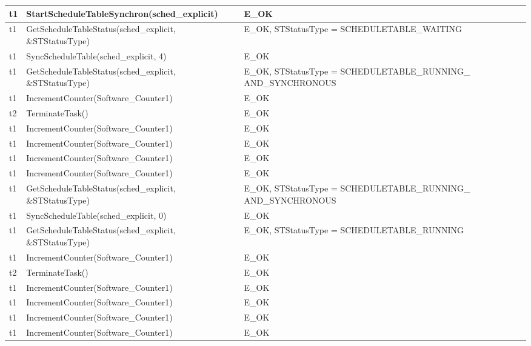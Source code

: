 \documentclass[10pt]{article}
\newlength{\Li}\settowidth{\Li}{Running}
\newlength{\Lii}\setlength{\Lii}{7cm}
\newlength{\Liiii}\setlength{\Liiii}{0.9cm}
\newlength{\Liii}\setlength{\Liii}{\textwidth} \addtolength{\Liii}{-\Li} \addtolength{\Liii}{-\Lii} \addtolength{\Liii}{-\Liiii}
\begin{document}
	\begin{supertabular}{|p{\Li}|p{\Lii}|p{\Liii}|p{\Liiii}|} \hline 
	t1		& StartScheduleTableSynchron(sched\_explicit)					& E\_OK																	& \\ \hline
	t1		& GetScheduleTableStatus(sched\_explicit, \&STStatusType)			& E\_OK, STStatusType = SCHEDULETABLE\_WAITING								& \\ \hline
	t1		& SyncScheduleTable(sched\_explicit, 4)							& E\_OK																	& \\ \hline
	t1		& GetScheduleTableStatus(sched\_explicit, \&STStatusType)			& E\_OK, STStatusType = SCHEDULETABLE\_RUNNING\_ AND\_SYNCHRONOUS		& \\ \hline
	t1		& IncrementCounter(Software\_Counter1)						& E\_OK																	& \\ \hline
	t2		& TerminateTask()											& E\_OK																	& \\ \hline
	t1		& IncrementCounter(Software\_Counter1)						& E\_OK																	& \\ \hline
	t1		& IncrementCounter(Software\_Counter1)						& E\_OK																	& \\ \hline
	t1		& IncrementCounter(Software\_Counter1)						& E\_OK																	& \\ \hline
	t1		& IncrementCounter(Software\_Counter1)						& E\_OK																	& \\ \hline
	t1		& GetScheduleTableStatus(sched\_explicit, \&STStatusType)			& E\_OK, STStatusType = SCHEDULETABLE\_RUNNING\_ AND\_SYNCHRONOUS		& \\ \hline
	t1		& SyncScheduleTable(sched\_explicit, 0)							& E\_OK																	& \\ \hline
	t1		& GetScheduleTableStatus(sched\_explicit, \&STStatusType)			& E\_OK, STStatusType = SCHEDULETABLE\_RUNNING 							& \\ \hline
	t1		& IncrementCounter(Software\_Counter1)						& E\_OK																	& \\ \hline
	t2		& TerminateTask()											& E\_OK																	& \\ \hline
	t1		& IncrementCounter(Software\_Counter1)						& E\_OK																	& \\ \hline
	t1		& IncrementCounter(Software\_Counter1)						& E\_OK																	& \\ \hline
	t1		& IncrementCounter(Software\_Counter1)						& E\_OK																	& \\ \hline
	t1		& IncrementCounter(Software\_Counter1)						& E\_OK																	& \\ \hline

\end{supertabular}
\end{document}
